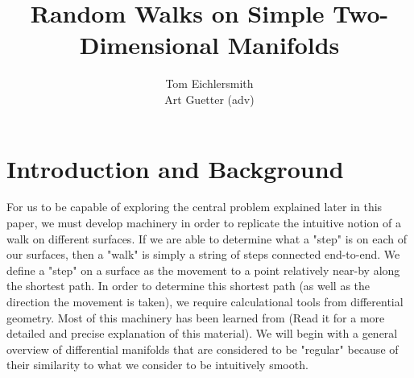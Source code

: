 \documentclass{article}
\title{Random Walks on Simple Two-Dimensional Manifolds}
\author{Tom Eichlersmith \\ Art Guetter (adv)}
\begin{document}
	
\maketitle

\section{Introduction and Background}
	For us to be capable of exploring the central problem explained later in this paper, we must develop machinery in order to replicate the intuitive notion of a walk on different surfaces.
	If we are able to determine what a "step" is on each of our surfaces, then a "walk" is simply a string of steps connected end-to-end.
	We define a "step" on a surface as the movement to a point relatively near-by along the shortest path.
	In order to determine this shortest path (as well as the direction the movement is taken), we require calculational tools from differential geometry.
	Most of this machinery has been learned from \cite{BanchoffLovett_DiffGeo_2010} (Read it for a more detailed and precise explanation of this material).
	We will begin with a general overview of differential manifolds that are considered to be "regular" because of their similarity to what we consider to be intuitively smooth.
	
\end{document}
